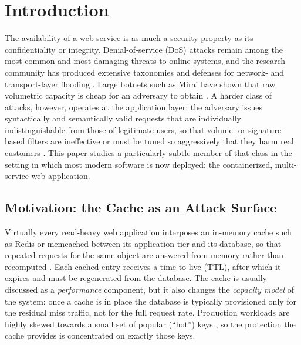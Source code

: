 \section{Introduction}
\label{sec:intro}

The availability of a web service is as much a security property as its
confidentiality or integrity. Denial-of-service (DoS) attacks remain among the most
common and most damaging threats to online systems, and the research community has
produced extensive taxonomies and defenses for network- and transport-layer flooding
\cite{mirkovic2004,zargar2013}. Large botnets such as Mirai have shown that raw
volumetric capacity is cheap for an adversary to obtain \cite{antonakakis2017}. A
harder class of attacks, however, operates at the application layer: the adversary
issues syntactically and semantically valid requests that are individually
indistinguishable from those of legitimate users, so that volume- or signature-based
filters are ineffective or must be tuned so aggressively that they harm real customers
\cite{praseed2019,xie2009,ranjan2009}. This paper studies a particularly subtle member
of that class in the setting in which most modern software is now deployed: the
containerized, multi-service web application.

\subsection{Motivation: the Cache as an Attack Surface}
Virtually every read-heavy web application interposes an in-memory cache such as
Redis or memcached between its application tier and its database, so that repeated
requests for the same object are answered from memory rather than recomputed
\cite{fitzpatrick2004,nishtala2013}. Each cached entry receives a time-to-live (TTL),
after which it expires and must be regenerated from the database. The cache is usually
discussed as a \emph{performance} component, but it also changes the \emph{capacity
model} of the system: once a cache is in place the database is typically provisioned
only for the residual miss traffic, not for the full request rate. Production
workloads are highly skewed towards a small set of popular (``hot'') keys
\cite{breslau1999,atikoglu2012}, so the protection the cache provides is concentrated
on exactly those keys.

